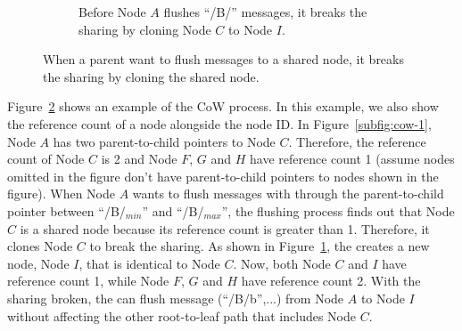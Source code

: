 \begin{figure}
\begin{subfigure}{\textwidth}
        \caption{\label{subfig:cow-2} Before Node $A$ flushes ``/B/'' messages,
        it breaks the sharing by cloning Node $C$ to Node $I$.}
    \end{subfigure}
    \caption[\bedags break node sharing with CoW]{\label{fig:cow}
        When a parent want to flush messages to a shared node,
        it breaks the sharing by cloning the shared node.}
\end{figure}

Figure~\ref{fig:cow} shows an example of the CoW process.
In this example, we also show the reference count of a node alongside the node
ID.
In Figure~\ref{subfig:cow-1}, Node $A$ has two parent-to-child pointers to
Node $C$.
Therefore, the reference count of Node $C$ is 2 and
Node $F$, $G$ and $H$ have reference count 1
(assume nodes omitted in the figure don't have parent-to-child pointers
to nodes shown in the figure).
When Node $A$ wants to flush messages with through the parent-to-child pointer
between ``/B/$_{min}$'' and ``/B/$_{max}$'',
the flushing process finds out that Node $C$ is a shared node because its
reference count is greater than 1.
Therefore, it clones Node $C$ to break the sharing.
As shown in Figure~\ref{subfig:cow-2}, the \bedag creates a new node, Node $I$,
that is identical to Node $C$.
Now, both Node $C$ and $I$ have reference count 1, while Node $F$, $G$ and
$H$ have reference count 2.
With the sharing broken, the \bedag can flush message \putm(``/B/b'',...) from
Node $A$ to Node $I$ without affecting the other root-to-leaf path that
includes Node $C$.


